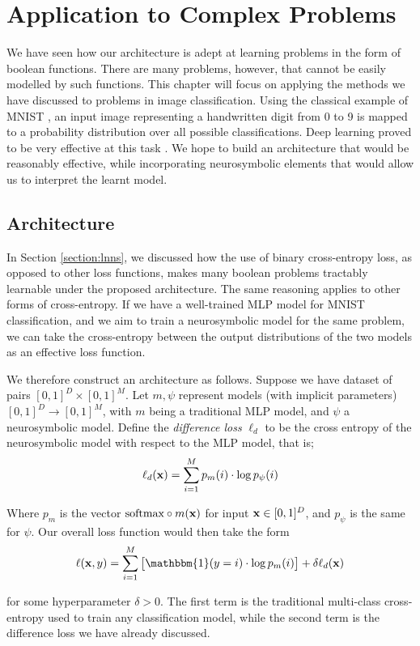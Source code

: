 \chapter{Application to Complex Problems}

We have seen how our architecture is adept at learning problems in the form of boolean functions. There are many problems, however, that cannot be easily modelled by such functions. This chapter will focus on applying the methods we have discussed to problems in image classification. Using the classical example of MNIST \cite{mnist}, an input image representing a handwritten digit from 0 to 9 is mapped to a probability distribution over all possible classifications. Deep learning proved to be very effective at this task \cite{mnist}. We hope to build an architecture that would be reasonably effective, while incorporating neurosymbolic elements that would allow us to interpret the learnt model.

\section{Architecture}

In Section \ref{section:lnns}, we discussed how the use of binary cross-entropy loss, as opposed to other loss functions, makes many boolean problems tractably learnable under the proposed architecture. The same reasoning applies to other forms of cross-entropy. If we have a well-trained MLP model for MNIST classification, and we aim to train a neurosymbolic model for the same problem, we can take the cross-entropy between the output distributions of the two models as an effective loss function.

We therefore construct an architecture as follows. Suppose we have dataset of pairs $[0,1]^D \times [0,1]^M$. Let $m, \psi$ represent models (with implicit parameters) $[0,1]^D \rightarrow [0,1]^M$, with $m$ being a traditional MLP model, and $\psi$ a neurosymbolic model. Define the \textit{difference loss} $\ell_d$ to be the cross entropy of the neurosymbolic model with respect to the MLP model, that is;
$$\ell_d(\mathbf{x}) = \sum_{i=1}^M p_m(i) \cdot \log p_\psi(i)$$

Where $p_m$ is the vector $\text{softmax} \circ m(\mathbf{x})$ for input $\mathbf{x} \in [0,1]^D$, and $p_\psi$ is the same for $\psi$. Our overall loss function would then take the form
$$\ell(\vx, y) = \sum_{i=1}^M \left[ \mathbbm{1}(y = i) \cdot \log p_m(i) \right] + \delta \ell_d(\vx)$$

for some hyperparameter $\delta > 0$. The first term is the traditional multi-class cross-entropy used to train any classification model, while the second term is the difference loss we have already discussed.

